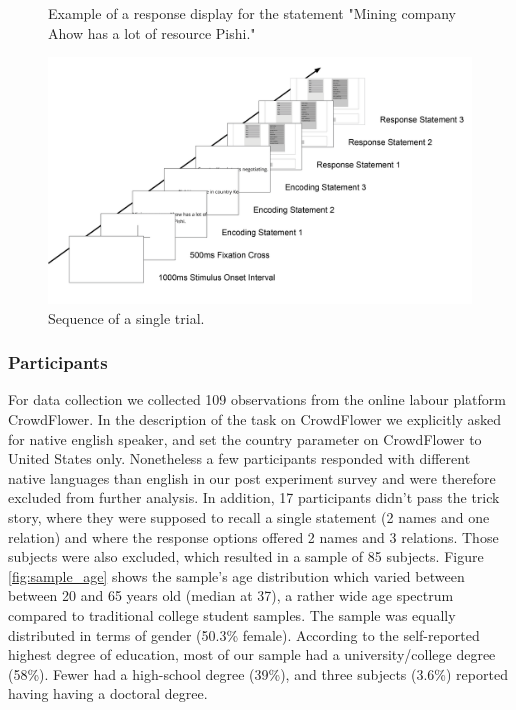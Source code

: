 \documentclass[a4paper,man,natbib,floatsintext,import]{apa6}
\begin{document}
\begin{figure}
\begin{center}
\caption{Example of a response display for the statement "Mining company Ahow has a lot of resource Pishi."}
\label{fig:example_response_menu}
\end{center}
\end{figure}

\begin{figure}
\begin{center}
\includegraphics[width=\textwidth]{figures/trial_sequence.png}
\caption{Sequence of a single trial.}
\label{fig:trial_sequence}
\end{center}
\end{figure}

\subsubsection{Participants}
For data collection we collected 109 observations from the online labour platform CrowdFlower. In the description of the task on CrowdFlower we explicitly asked for native english speaker, and set the country parameter on CrowdFlower to United States only. Nonetheless a few participants responded with different native languages than english in our post experiment survey and were therefore excluded from further analysis. In addition, 17 participants didn't pass the trick story, where they were supposed to recall a single statement (2 names and one relation) and where the response options offered 2 names and 3 relations. Those subjects were also excluded, which resulted in a sample of 85 subjects. Figure \ref{fig:sample_age} shows the sample's age distribution which varied between between 20 and 65 years old (median at 37), a rather wide age spectrum compared to traditional college student samples. The sample was equally distributed in terms of gender (50.3\% female). According to the self-reported highest degree of education, most of our sample had a university/college degree (58\%). Fewer had a high-school degree (39\%), and three subjects (3.6\%) reported having having a doctoral degree.
\end{document}
